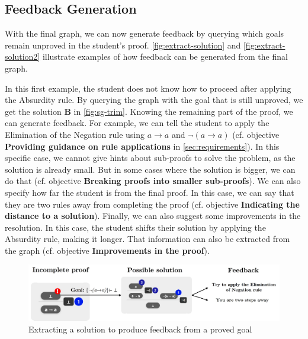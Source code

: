 \subsection{Feedback Generation}
With the final graph, we can now generate feedback by querying which goals remain unproved in the student's proof. \autoref{fig:extract-solution} and \autoref{fig:extract-solution2} illustrate examples of how feedback can be generated from the final graph.

In this first example, the student does not know how to proceed after applying the Absurdity rule. By querying the  graph with the goal that is still unproved, we get the solution \textbf{B} in \autoref{fig:sg-trim}. Knowing the remaining part of the proof, we can generate feedback. For example, we can tell the student to apply the Elimination of the Negation rule using \(a \to a \) and  \(\lnot(a \to a) \) (cf. objective \textbf{Providing guidance on rule applications} in \autoref{sec:requirements}). In this specific case, we cannot give hints about sub-proofs to solve the problem, as the solution is already small. But in some cases where the solution is bigger, we can do that (cf. objective \textbf{Breaking proofs into smaller sub-proofs}). We can also specify how far the student is from the final proof. In this case, we can say that they are two rules away from completing the proof (cf. objective \textbf{Indicating the distance to a solution}). Finally, we can also suggest some improvements in the resolution. In this case, the student shifts their solution by applying the Absurdity rule, making it longer. That information can also be extracted from the graph (cf. objective \textbf{Improvements in the proof}).

\begin{figure}[t]
    \centering
    \includegraphics[width=0.9\linewidth]{resources/trim-pos-feed.jpg}
    \caption{Extracting a solution to produce feedback from a proved goal}
    \label{fig:extract-solution}
\end{figure}

